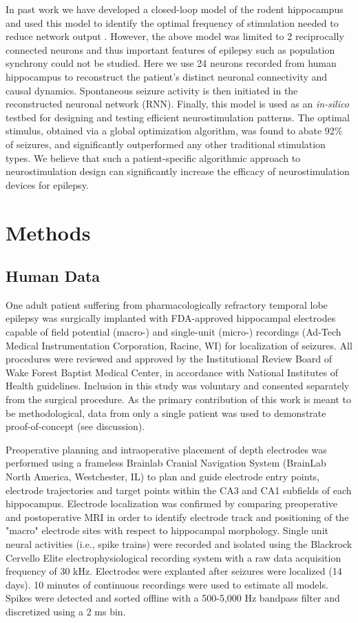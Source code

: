 \documentclass[journal,twoside,web]{ieeecolor}
\newcommand{\nn}{24}    %
\newcommand{\success}{92} %
\begin{document}
In past work we have developed a closed-loop model of the rodent hippocampus and used this model to identify the optimal frequency of stimulation needed to reduce network output \cite{sandler15clpp}.
However, the above model was limited to 2 reciprocally connected neurons and thus important features of epilepsy such as population synchrony could not be studied.
Here we use \nn{} neurons recorded from human hippocampus to reconstruct the patient's distinct neuronal connectivity and causal dynamics.
Spontaneous seizure activity is then initiated in the reconstructed neuronal network (RNN).
Finally, this model is used as an \textit{in-silico} testbed for designing and testing efficient neurostimulation patterns.
The optimal stimulus, obtained via a global optimization algorithm, was found to abate \success{}\% of seizures, and significantly outperformed any other traditional stimulation types.
We believe that such a patient-specific algorithmic approach to neurostimulation design can significantly increase the efficacy of neurostimulation devices for epilepsy.


\section{Methods \label{SM}}

\subsection{Human Data}

One adult patient suffering from pharmacologically refractory temporal lobe epilepsy was surgically implanted with FDA-approved hippocampal electrodes capable of field potential (macro-) and single-unit (micro-) recordings (Ad-Tech Medical Instrumentation Corporation, Racine, WI) for localization of seizures. 
All procedures were reviewed and approved by the Institutional Review Board of Wake Forest Baptist Medical Center, in accordance with National Institutes of Health guidelines.
Inclusion in this study was voluntary and consented separately from the surgical procedure. 
As the primary contribution of this work is meant to be methodological, data from only a single patient was used to demonstrate proof-of-concept (see discussion). 

Preoperative planning and intraoperative placement of depth electrodes was performed using a frameless Brainlab Cranial Navigation System (BrainLab North America, Westchester, IL) to plan and guide electrode entry points, electrode trajectories and target points within the CA3 and CA1 subfields of each hippocampus.
Electrode localization was confirmed by comparing preoperative and postoperative MRI in order to identify electrode track and positioning of the "macro" electrode sites with respect to hippocampal morphology.
Single unit neural activities (i.e., spike trains) were recorded and isolated using the Blackrock Cervello Elite electrophysiological recording system with a raw data acquisition frequency of 30 kHz.
Electrodes were explanted after seizures were localized (14 days).
10 minutes of continuous recordings were used to estimate all models.
Spikes were detected and sorted offline with a 500-5,000 Hz bandpass filter and discretized using a 2 ms bin.
\end{document}
